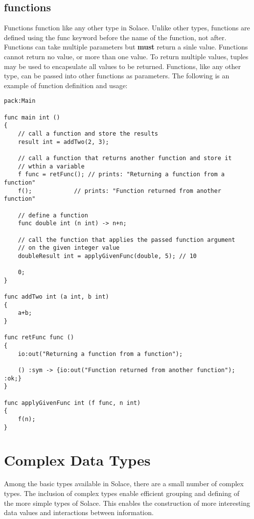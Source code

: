 \documentclass{article}
\begin{document}
\subsection{functions}

Functions function like any other type in Solace. Unlike other types, functions are
defined using the func keyword before the name of the function, not after. Functions
can take multiple parameters but \textbf{must} return a sinle value. Functions cannot return
no value, or more than one value. To return multiple values, tuples may be used to
encapsulate all values to be returned.
Functions, like any other type, can be passed into other functions as parameters.
The following is an example of function definition and usage:

\begin{lstlisting}
pack:Main

func main int ()
{
	// call a function and store the results
	result int = addTwo(2, 3);
	
	// call a function that returns another function and store it
	// wthin a variable
	f func = retFunc(); // prints: "Returning a function from a function"
	f();		    // prints: "Function returned from another function"
	
	// define a function
	func double int (n int) -> n+n;
	
	// call the function that applies the passed function argument
	// on the given integer value
	doubleResult int = applyGivenFunc(double, 5); // 10
	
	0;
}

func addTwo int (a int, b int)
{
	a+b;
}

func retFunc func ()
{
	io:out("Returning a function from a function");
	
	() :sym -> {io:out("Function returned from another function"); :ok;}
}

func applyGivenFunc int (f func, n int)
{
	f(n);
}
\end{lstlisting}

\section{Complex Data Types}

Among the basic types available in Solace, there are a small number of complex types. The inclusion
of complex types enable efficient grouping and defining of the more simple types of Solace. This
enables the construction of more interesting data values and interactions between information.
\end{document}
